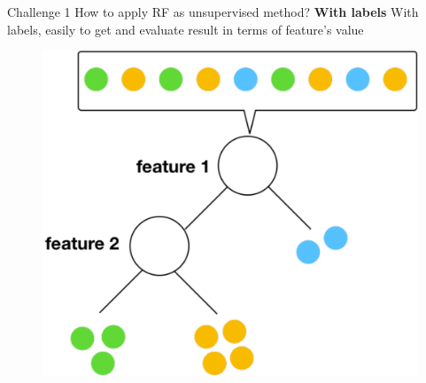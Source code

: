\documentclass[shortpres]{beamer}
\begin{document}
\begin{frame}{Challenge 1 How to apply RF as unsupervised method?}	
  \textbf{With labels} With labels, easily to get and evaluate result in terms of feature's value
  \begin{figure}
    \includegraphics[height=0.6\textheight]{fig/normalrf.pdf} 
  \end{figure}
\end{frame}
\end{document}
